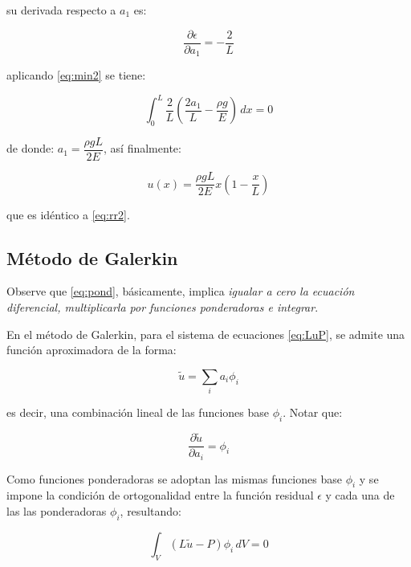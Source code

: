 \begin{exercise}
		su derivada respecto a $a_1$ es:
		
		\begin{equation}
			\dfrac{\partial \epsilon}{\partial a_1} = -\dfrac{2}{L}
		\end{equation}
		
		aplicando \eqref{eq:min2} se tiene:
		
		\begin{equation}
			\int_{0}^{L} \dfrac{2}{L} \left( \dfrac{2a_1}{L} - \dfrac{\rho g}{E} \right) \, dx = 0
		\end{equation}
		
		de donde: $a_1 = \dfrac{\rho g L}{2E}$, así finalmente:
		
		\begin{equation}
			u(x) = \dfrac{\rho g L}{2E} x \left(1 - \dfrac{x}{L}\right)
		\end{equation}
		
		que es idéntico a \eqref{eq:rr2}.
\end{exercise}

\subsection{Método de Galerkin}

Observe que \eqref{eq:pond}, básicamente, implica \textit{igualar a cero la ecuación diferencial, multiplicarla por funciones ponderadoras e integrar}.

En el método de Galerkin, para el sistema de ecuaciones \eqref{eq:LuP}, se admite una función aproximadora de la forma:

\begin{equation}
	\tilde{u} = \sum_i a_i \phi_i
	\label{eq:gal1}
\end{equation}

es decir, una combinación lineal de las funciones base $\phi_i$. Notar que:

\begin{equation}
	\dfrac{\partial \tilde{u}}{\partial a_i} = \phi_i
\end{equation}

Como funciones ponderadoras se adoptan las mismas funciones base $\phi_i$ y se impone la condición de ortogonalidad entre la función residual $\epsilon$ y cada una de las las ponderadoras $\phi_i$, resultando:

\begin{equation}
	\int_V \left(L\tilde{u} - P \right) \phi_i \, dV = 0
\end{equation}


